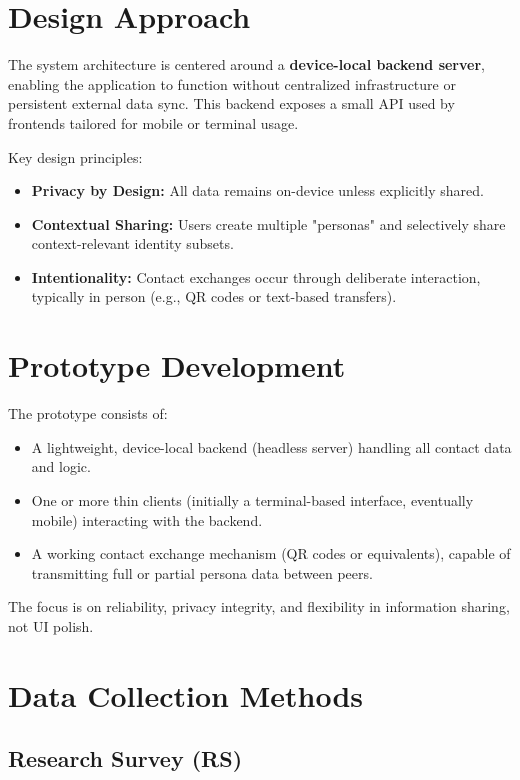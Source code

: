 \documentclass{imc-inf}
\begin{document}
\section{Design Approach}

The system architecture is centered around a \textbf{device-local backend server}, enabling the application to function without centralized infrastructure or persistent external data sync. This backend exposes a small API used by frontends tailored for mobile or terminal usage.

Key design principles:
\begin{itemize}
  \item \textbf{Privacy by Design:} All data remains on-device unless explicitly shared.
  \item \textbf{Contextual Sharing:} Users create multiple "personas" and selectively share context-relevant identity subsets.
  \item \textbf{Intentionality:} Contact exchanges occur through deliberate interaction, typically in person (e.g., QR codes or text-based transfers).
\end{itemize}

\section{Prototype Development}

The prototype consists of:
\begin{itemize}
  \item A lightweight, device-local backend (headless server) handling all contact data and logic.
  \item One or more thin clients (initially a terminal-based interface, eventually mobile) interacting with the backend.
  \item A working contact exchange mechanism (QR codes or equivalents), capable of transmitting full or partial persona data between peers.
\end{itemize}

The focus is on reliability, privacy integrity, and flexibility in information sharing, not UI polish.

\section{Data Collection Methods}

\subsection{Research Survey (RS)}
\end{document}
